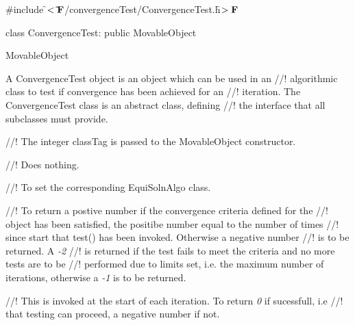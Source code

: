 
\indent \#include \f$<\tilde{}{\bf F}$/convergenceTest/ConvergenceTest.h\f$>{\bf F}$

\indent class ConvergenceTest: public MovableObject

\indent MovableObject
\indent{}

\indent A ConvergenceTest object is an object which can be used in an
//! algorithmic class to test if convergence has been achieved for an 
//! iteration. The ConvergenceTest class is an abstract class, defining
//! the interface that all subclasses must provide.

\indent{} 
\indent{}
\indent{} 
\indent{}
\indent{} 
\indent{}
\indent{}
\indent{}

//! The integer \p classTag is passed to the MovableObject constructor.

//! Does nothing.

//! To set the corresponding EquiSolnAlgo class.

//! To return a postive number if the convergence criteria defined for the
//! object has been satisfied, the positibe number equal to the number of times 
//! since \p start that test() has been invoked. Otherwise a negative number 
//! is to be returned. A {\em -2} 
//! is returned if the test fails to meet the criteria and no more tests are to be 
//! performed due to limits set, i.e. the maximum number of iterations, otherwise a
{\em -1} is to be returned.

//! This is invoked at the start of each iteration. To return {\em 0} if sucessfull, i.e 
//! that testing can proceed, a negative number if not.
